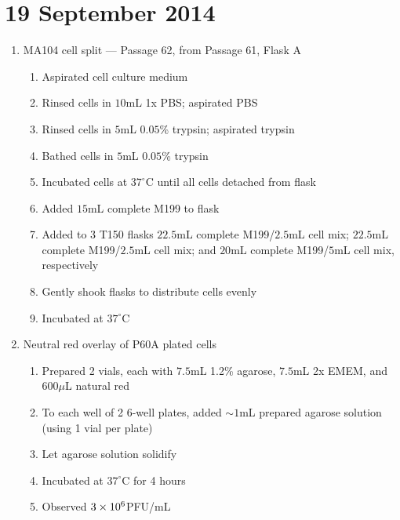 \section*{19 September 2014}

\begin{enumerate}
	\item MA104 cell split --- Passage 62, from Passage 61, Flask A
		\begin{enumerate}
			\item Aspirated cell culture medium
			\item Rinsed cells in $10$mL 1x PBS; aspirated PBS
			\item Rinsed cells in $5$mL $0.05$\% trypsin; aspirated trypsin
			\item Bathed cells in $5$mL $0.05$\% trypsin
			\item Incubated cells at $37^{\circ}$C until all cells detached from flask
			\item Added $15$mL complete M199 to flask
			\item Added to $3$ T150 flasks $22.5$mL complete M199/$2.5$mL cell mix; $22.5$mL complete M199/$2.5$mL cell mix; and $20$mL complete M199/$5$mL cell mix, respectively
			\item Gently shook flasks to distribute cells evenly
			\item Incubated at $37^{\circ}$C
		\end{enumerate}
	\item Neutral red overlay of P60A plated cells
		\begin{enumerate}
			\item Prepared 2 vials, each with $7.5$mL 1.2\% agarose, $7.5$mL 2x EMEM, and $600\mu$L natural red
			\item To each well of 2 6-well plates, added $\sim 1$mL prepared agarose solution (using 1 vial per plate)
			\item Let agarose solution solidify
			\item Incubated at $37^{\circ}$C for 4 hours
			\item Observed $3\times 10^{6}$PFU/mL
		\end{enumerate}
\end{enumerate}